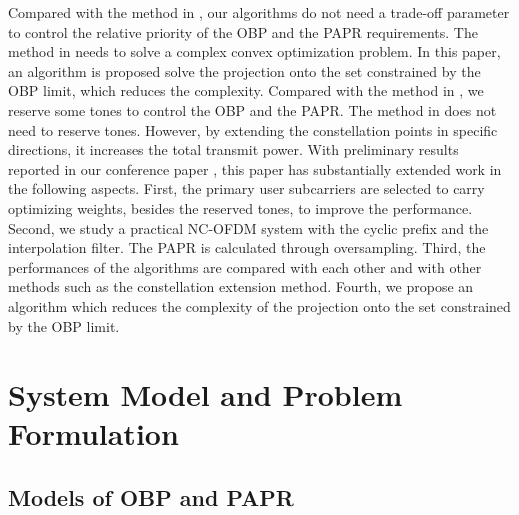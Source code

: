 \documentclass[paper]{ieice}
\begin{document}
Compared with the method in \cite{4411634}, our algorithms do not need a trade-off parameter to control the relative priority of the OBP and the PAPR requirements. The method in  \cite{4411634} needs to solve a complex convex optimization problem. In this paper, an algorithm is proposed solve the projection onto the set constrained by the OBP limit,  which reduces the complexity. Compared with the method in \cite{ni2015joint}, we reserve some tones to control the OBP and the PAPR.  The method in \cite{ni2015joint} does not need to reserve tones.  However, by extending the constellation points in specific directions, it increases the total transmit power.  With preliminary results reported in our conference paper \cite{6831614}, this paper has substantially extended work in the following aspects. First, the primary user subcarriers are selected to carry optimizing weights, besides the reserved tones, to improve the performance. Second, we study a practical NC-OFDM system with the cyclic prefix and the interpolation filter. The PAPR is calculated through oversampling. Third, the performances of the algorithms are compared with each other and with other methods such as the  constellation extension method.  Fourth, we propose an algorithm which reduces the complexity of the projection onto the set constrained by the OBP limit.

\section{System Model and Problem Formulation} \label{sec:model}
\subsection{Models of OBP and PAPR}
\end{document}
